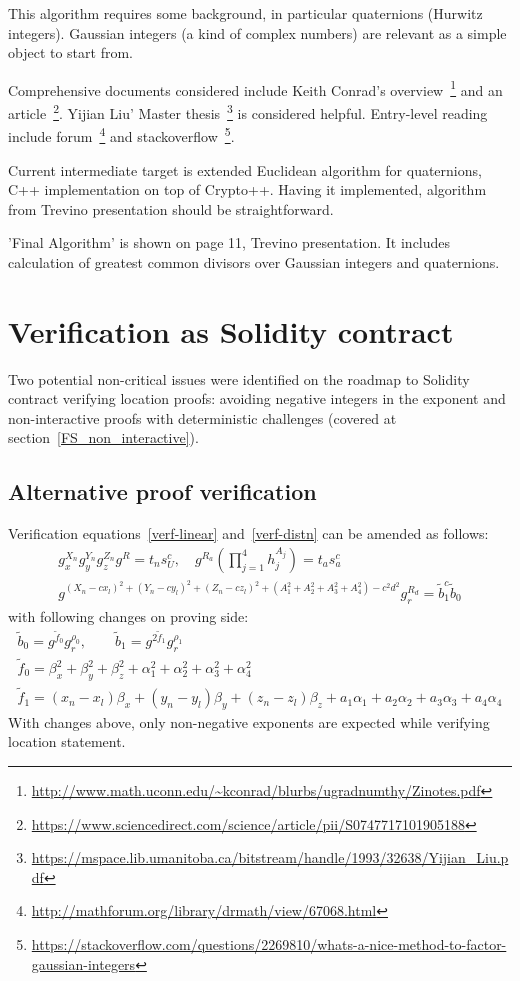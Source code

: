\documentclass[a4paper,12pt]{article}
\begin{document}
This algorithm requires some background, in particular quaternions (Hurwitz integers).
Gaussian integers (a kind of complex numbers) are relevant as a simple object to start from.

Comprehensive documents considered include
Keith Conrad's overview~\footnote{\url{http://www.math.uconn.edu/~kconrad/blurbs/ugradnumthy/Zinotes.pdf}}
and an article~\footnote{\url{https://www.sciencedirect.com/science/article/pii/S0747717101905188}}.
%
Yijian Liu' Master thesis~\footnote{\url{https://mspace.lib.umanitoba.ca/bitstream/handle/1993/32638/Yijian_Liu.pdf}} is considered helpful.
%
Entry-level reading include
forum~\footnote{\url{http://mathforum.org/library/drmath/view/67068.html}}
and stackoverflow~\footnote{\url{https://stackoverflow.com/questions/2269810/whats-a-nice-method-to-factor-gaussian-integers}}.

Current intermediate target is extended Euclidean algorithm for quaternions, C++ implementation on top of Crypto++.
Having it implemented, algorithm from Trevino presentation should be straightforward.

'Final Algorithm' is shown on page 11, Trevino presentation.
It includes calculation of greatest common divisors over Gaussian integers and quaternions.

\section{Verification as Solidity contract}

Two potential non-critical issues were identified on the roadmap to Solidity contract verifying location proofs:
avoiding negative integers in the exponent and
non-interactive proofs with deterministic challenges (covered at section~\ref{FS_non_interactive}).

\subsection{Alternative proof verification}

Verification equations~\eqref{verf-linear} and~\eqref{verf-distn} can be amended as follows:
\begin{gather}
  g_x^{X_n} g_y^{Y_n} g_z^{Z_n} g^{R} = t_n s_U^{c}, \quad
  g^{R_a} (\prod_{j=1}^4 h_j^{A_j}) = t_a s_a^{c} \\
%
  g^{(X_n - c x_l)^2 + (Y_n - c y_l)^2 + (Z_n - c z_l)^2 +
     (A_1^2 + A_2^2 + A_3^2 + A_4^2) - c^2 d^2}
  g_r^{R_d} = \tilde b_1^{c} \tilde b_0
\end{gather}
with following changes on proving side:
\begin{gather}
  \tilde b_0 = g^{\tilde f_0} g_r^{\rho_0},   \qquad
  \tilde b_1 = g^{2 \tilde f_1} g_r^{\rho_1}    \\
\tilde f_0 = \beta_x^2 + \beta_y^2 +\beta_z^2 + \alpha_1^2 + \alpha_2^2 + \alpha_3^2 + \alpha_4^2  \\
\tilde f_1 = (x_n - x_l) \beta_x  + (y_n - y_l) \beta_y  + (z_n - z_l) \beta_z + a_1 \alpha_1 + a_2 \alpha_2 + a_3 \alpha_3 + a_4 \alpha_4
\end{gather}
With changes above, only non-negative exponents are expected
while verifying location statement.
\end{document}
